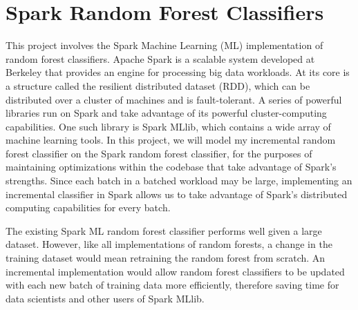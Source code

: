 \documentclass{article}
\begin{document}
\section{Spark Random Forest Classifiers}

This project involves the Spark Machine Learning (ML) implementation of random
forest classifiers. Apache Spark is a scalable system developed at Berkeley
that provides an engine for processing big data workloads. At its core is a
structure called the resilient distributed dataset (RDD), which can be
distributed over a cluster of machines and is fault-tolerant. A series of
powerful libraries run on Spark and take advantage of its powerful
cluster-computing capabilities. One such library is Spark MLlib, which contains
a wide array of machine learning tools. In this project, we will model my
incremental random forest classifier on the Spark random forest classifier, for
the purposes of maintaining optimizations within the codebase that take
advantage of Spark's strengths. Since each batch in a batched workload may be
large, implementing an incremental classifier in Spark allows us to take
advantage of Spark's distributed computing capabilities for every batch.

The existing Spark ML random forest classifier performs well given a large
dataset. However, like all implementations of random forests, a change in the
training dataset would mean retraining the random forest from scratch. An
incremental implementation would allow random forest classifiers to be updated
with each new batch of training data more efficiently, therefore saving time
for data scientists and other users of Spark MLlib.
\end{document}
